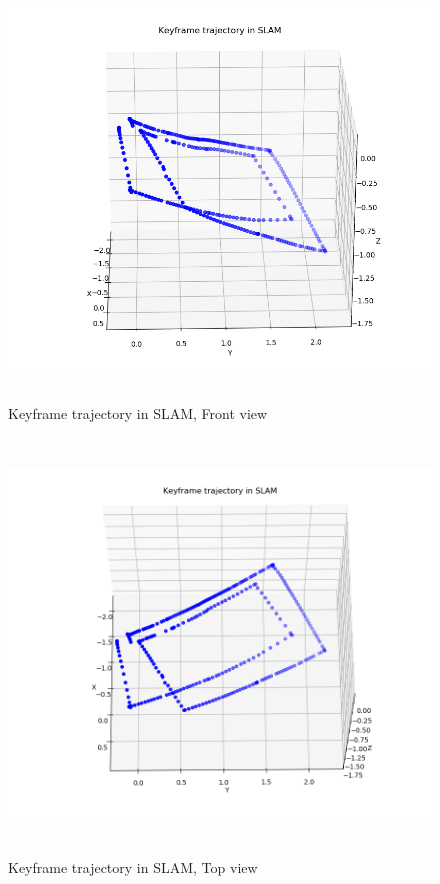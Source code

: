 \begin{figure}[h]
    \centering
    \includegraphics[height=11cm, width=15cm]{Images/KFTrajectoryinSLAMFront.png}
    \caption{Keyframe trajectory in SLAM, Front view}
    \label{fig:kfgraphSLAMfront}
\end{figure}

\begin{figure}[h]
    \centering
    \includegraphics[height=11cm, width=15cm]{Images/KFTrajectorySLAMTop.png}
    \caption{Keyframe trajectory in SLAM, Top view}
    \label{fig:kfgraphSLAMtop}
\end{figure}

